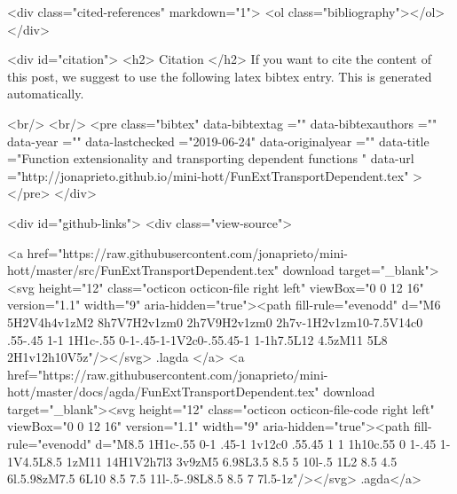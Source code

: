   <div class="cited-references" markdown="1">
  <ol class="bibliography"></ol>
  </div>


  
  <div id="citation">
  <h2> Citation </h2>
  If you want to cite the content of this post,
  we suggest to use the following latex bibtex entry.
  This is generated automatically.

  <br/>
  <br/>
  <pre class="bibtex"
       data-bibtextag =""
       data-bibtexauthors =""
       data-year =""
       data-lastchecked ="2019-06-24"
       data-originalyear =""
       data-title ="Function extensionality and transporting dependent functions "
       data-url ="http://jonaprieto.github.io/mini-hott/FunExtTransportDependent.tex"
  ></pre>
  </div>
  

  <div id="github-links">
    <div class="view-source">
      
        <a href="https://raw.githubusercontent.com/jonaprieto/mini-hott/master/src/FunExtTransportDependent.tex" download target="_blank"><svg height="12" class="octicon octicon-file right left" viewBox="0 0 12 16" version="1.1" width="9" aria-hidden="true"><path fill-rule="evenodd" d="M6 5H2V4h4v1zM2 8h7V7H2v1zm0 2h7V9H2v1zm0 2h7v-1H2v1zm10-7.5V14c0 .55-.45 1-1 1H1c-.55 0-1-.45-1-1V2c0-.55.45-1 1-1h7.5L12 4.5zM11 5L8 2H1v12h10V5z"/></svg> .lagda </a>
        <a href="https://raw.githubusercontent.com/jonaprieto/mini-hott/master/docs/agda/FunExtTransportDependent.tex" download target="_blank"><svg height="12" class="octicon octicon-file-code right left" viewBox="0 0 12 16" version="1.1" width="9" aria-hidden="true"><path fill-rule="evenodd" d="M8.5 1H1c-.55 0-1 .45-1 1v12c0 .55.45 1 1 1h10c.55 0 1-.45 1-1V4.5L8.5 1zM11 14H1V2h7l3 3v9zM5 6.98L3.5 8.5 5 10l-.5 1L2 8.5 4.5 6l.5.98zM7.5 6L10 8.5 7.5 11l-.5-.98L8.5 8.5 7 7l.5-1z"/></svg> .agda</a>
      
